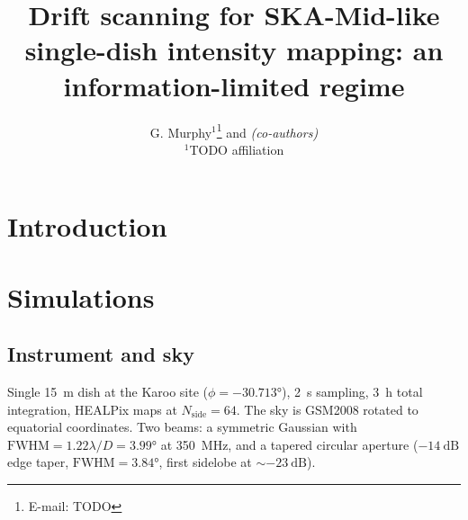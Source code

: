 \documentclass[a4paper,fleqn,usenatbib]{mnras}
\title[Drift scanning is information-limited]{Drift scanning for SKA-Mid-like
single-dish intensity mapping: an information-limited regime}
\author[G. Murphy et al.]{
G. Murphy$^{1}$\thanks{E-mail: TODO}
and \textit{(co-authors)}
\\
$^{1}$TODO affiliation
}
\begin{document}
\maketitle

\begin{abstract}
\end{abstract}

\section{Introduction}

\section{Simulations}
\label{sec:sims}

\subsection{Instrument and sky}
Single \SI{15}{\metre} dish at the Karoo site
($\phi = \ang{-30.713}$), \SI{2}{\second} sampling, \SI{3}{\hour} total
integration, HEALPix maps at $N_{\mathrm{side}} = 64$. The sky is GSM2008
rotated to equatorial coordinates. Two beams: a symmetric Gaussian with
$\mathrm{FWHM} = 1.22\lambda/D = \ang{3.99}$ at \SI{350}{\mega\hertz}, and a
tapered circular aperture ($-\SI{14}{\deci\bel}$ edge taper,
$\mathrm{FWHM} = \ang{3.84}$, first sidelobe at $\sim-\SI{23}{\deci\bel}$).
\end{document}
